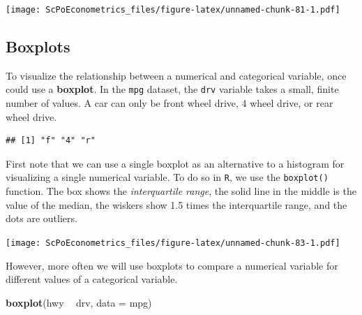 \documentclass[]{book}
\newenvironment{Shaded}{\begin{snugshade}}{\end{snugshade}}
\newcommand{\KeywordTok}[1]{\textcolor[rgb]{0.13,0.29,0.53}{\textbf{#1}}}
\newcommand{\DataTypeTok}[1]{\textcolor[rgb]{0.13,0.29,0.53}{#1}}
\newcommand{\StringTok}[1]{\textcolor[rgb]{0.31,0.60,0.02}{#1}}
\newcommand{\OperatorTok}[1]{\textcolor[rgb]{0.81,0.36,0.00}{\textbf{#1}}}
\newcommand{\NormalTok}[1]{#1}
\theoremstyle{definition}
\theoremstyle{definition}
\theoremstyle{definition}
\theoremstyle{remark}
\begin{document}
\texttt{[image: ScPoEconometrics\_files/figure-latex/unnamed-chunk-81-1.pdf]}

\subsection{Boxplots}\label{boxplots}

To visualize the relationship between a numerical and categorical
variable, once could use a \textbf{boxplot}. In the \texttt{mpg}
dataset, the \texttt{drv} variable takes a small, finite number of
values. A car can only be front wheel drive, 4 wheel drive, or rear
wheel drive.

\begin{Shaded}
\end{Shaded}

\begin{verbatim}
## [1] "f" "4" "r"
\end{verbatim}

First note that we can use a single boxplot as an alternative to a
histogram for visualizing a single numerical variable. To do so in
\texttt{R}, we use the \texttt{boxplot()} function. The box shows the
\emph{interquartile range}, the solid line in the middle is the value of
the median, the wiskers show 1.5 times the interquartile range, and the
dots are outliers.

\begin{Shaded}
\end{Shaded}

\texttt{[image: ScPoEconometrics\_files/figure-latex/unnamed-chunk-83-1.pdf]}

However, more often we will use boxplots to compare a numerical variable
for different values of a categorical variable.

\begin{Shaded}
\begin{Highlighting}[]
\KeywordTok{boxplot}\NormalTok{(hwy }\OperatorTok{~}\StringTok{ }\NormalTok{drv, }\DataTypeTok{data =}\NormalTok{ mpg)}
\end{Highlighting}
\end{Shaded}
\end{document}
